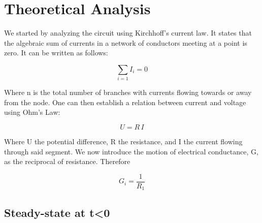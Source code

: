 \section{Theoretical Analysis}
\label{sec:analysis}


We started by analyzing the circuit using Kirchhoff's current law. It states that the algebraic sum of currents in a network of conductors meeting at a point is zero. It can be written as follows:

\begin{center}
\begin{equation}
\sum_{i=1} I_i=0
\label{current law}
\end{equation}
\end{center}
Where n is the total number of branches with currents flowing towards or away from the node.
One can then establish a relation between current and voltage using Ohm's Law:

\begin{center}
\begin{equation}
U=R\,I
\label{current law}
\end{equation}
\end{center}
Where U the potential difference, R the resistance, and I the current flowing through said segment. We now introduce the motion of electrical conductance, G, as the reciprocal of resistance. Therefore

\begin{center}
\begin{equation}
G_i=\frac{1}{R_1}
\label{current law}
\end{equation}
\end{center}

\subsection{Steady-state at t<0}

